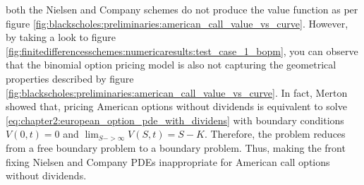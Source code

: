both the Nielsen and Company schemes do not produce the value function as per figure \eqref{fig:blackscholes:preliminaries:american_call_value_vs_curve}. However, by taking a look to figure \eqref{fig:finitedifferencesschemes:numericaresults:test_case_1_bopm}, you can observe that the binomial option pricing model is also not capturing the geometrical properties described by figure \eqref{fig:blackscholes:preliminaries:american_call_value_vs_curve}. In fact, Merton\cite{merton_1973} showed that, pricing American options without dividends is equivalent to solve \eqref{eq:chapter2:european_option_pde_with_dividens} with boundary conditions $V(0, t)=0$ and $\lim_{S->\infty}V(S,t)=S-K$. Therefore, the problem reduces from a free boundary problem to a boundary problem. Thus, making the front fixing Nielsen and Company PDEs inappropriate for American call options without dividends.

